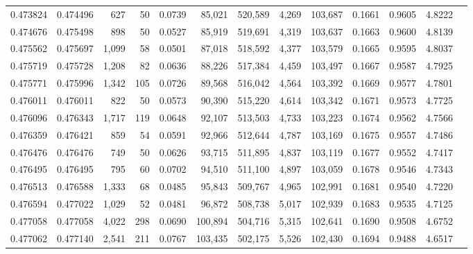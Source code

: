 \begin{tabular}{rrrrrrrrrrrrr}
0.473824 & 0.474496 &   627 &    50 &                                     0.0739 &  85,021 & 520,589 &   4,269 & 103,687 & 0.1661 & 0.9605 & 4.8222 \\
0.474676 & 0.475498 &   898 &    50 &                                     0.0527 &  85,919 & 519,691 &   4,319 & 103,637 & 0.1663 & 0.9600 & 4.8139 \\
0.475562 & 0.475697 & 1,099 &    58 &                                     0.0501 &  87,018 & 518,592 &   4,377 & 103,579 & 0.1665 & 0.9595 & 4.8037 \\
0.475719 & 0.475728 & 1,208 &    82 &                                     0.0636 &  88,226 & 517,384 &   4,459 & 103,497 & 0.1667 & 0.9587 & 4.7925 \\
0.475771 & 0.475996 & 1,342 &   105 &                                     0.0726 &  89,568 & 516,042 &   4,564 & 103,392 & 0.1669 & 0.9577 & 4.7801 \\
0.476011 & 0.476011 &   822 &    50 &                                     0.0573 &  90,390 & 515,220 &   4,614 & 103,342 & 0.1671 & 0.9573 & 4.7725 \\
0.476096 & 0.476343 & 1,717 &   119 &                                     0.0648 &  92,107 & 513,503 &   4,733 & 103,223 & 0.1674 & 0.9562 & 4.7566 \\
0.476359 & 0.476421 &   859 &    54 &                                     0.0591 &  92,966 & 512,644 &   4,787 & 103,169 & 0.1675 & 0.9557 & 4.7486 \\
0.476476 & 0.476476 &   749 &    50 &                                     0.0626 &  93,715 & 511,895 &   4,837 & 103,119 & 0.1677 & 0.9552 & 4.7417 \\
0.476495 & 0.476495 &   795 &    60 &                                     0.0702 &  94,510 & 511,100 &   4,897 & 103,059 & 0.1678 & 0.9546 & 4.7343 \\
0.476513 & 0.476588 & 1,333 &    68 &                                     0.0485 &  95,843 & 509,767 &   4,965 & 102,991 & 0.1681 & 0.9540 & 4.7220 \\
0.476594 & 0.477022 & 1,029 &    52 &                                     0.0481 &  96,872 & 508,738 &   5,017 & 102,939 & 0.1683 & 0.9535 & 4.7125 \\
0.477058 & 0.477058 & 4,022 &   298 &                                     0.0690 & 100,894 & 504,716 &   5,315 & 102,641 & 0.1690 & 0.9508 & 4.6752 \\
0.477062 & 0.477140 & 2,541 &   211 &                                     0.0767 & 103,435 & 502,175 &   5,526 & 102,430 & 0.1694 & 0.9488 & 4.6517 \\

\end{tabular}

